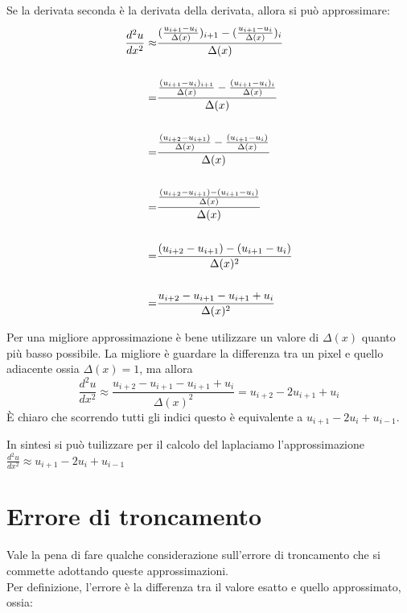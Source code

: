 \newpage
\raggedright
Se la derivata seconda è la derivata della derivata, allora si può approssimare:\\
\centering    
{\large
\begin{align*}
\frac{d^2u}{dx^2} \approx &
\frac{
(\frac{u_{i+1} - u_i}{\Delta(x)})_{i+1} 
- 
(\frac{u_{i+1} - u_i}{\Delta(x)})_i
}{\Delta(x)}
\\
\vline
\\
= &
\frac{
\frac{(u_{i+1} - u_i)_{i+1}}{\Delta(x)} 
-   
\frac{(u_{i+1} - u_i)_i}{\Delta(x)}
}{\Delta(x)}
\\
\vline 
\\
= &
\frac{
\frac{(u_{i+2} - u_{i+1})}{\Delta(x)} 
- 
\frac{(u_{i+1} - u_i)}{\Delta(x)}
}{\Delta(x)}
\\
\vline 
\\
= &
\frac{
\frac{(u_{i+2} - u_{i+1}) 
- 
(u_{i+1} - u_i)}{\Delta(x)}
}{\Delta(x)}
\\
\vline
\\
= &
\frac{
(u_{i+2} - u_{i+1}) 
- 
(u_{i+1} - u_i)}
{\Delta(x)^2}
\\
\vline 
\\
= &
\frac{
 u_{i+2} - u_{i+1} 
-u_{i+1} + {u_i}}
{\Delta(x)^2}
\\
\end{align*}
}
\raggedright
Per una migliore approssimazione è bene utilizzare un valore di $\Delta(x)$ quanto più basso possibile. La migliore è guardare la differenza tra un pixel e quello adiacente ossia $\Delta(x)=1$, ma allora 
{\large
$$\frac{d^2u}{dx^2} \approx
\frac{
 u_{i+2} - u_{i+1} 
-u_{i+1} + u_i}
{\Delta(x)^2} = u_{i+2} -2 u_{i+1} + u_i$$
}
\`E chiaro che scorrendo tutti gli indici questo è equivalente a $u_{i+1} -2 u_i + u_{i-1}.$

In sintesi si può tuilizzare per il calcolo del laplaciamo l'approssimazione \\
\vspace{2pt}
\centering 
{\large
$\frac{d^2u}{dx^2} \approx u_{i+1} -2 u_i + u_{i-1}$\\
}
\vspace{2pt}
\raggedright
\newpage
\section{Errore di troncamento}

Vale la pena di fare qualche considerazione sull'errore di troncamento che si commette adottando queste approssimazioni.\\
Per definizione, l'errore è la differenza tra il valore esatto e quello approssimato, ossia: 

